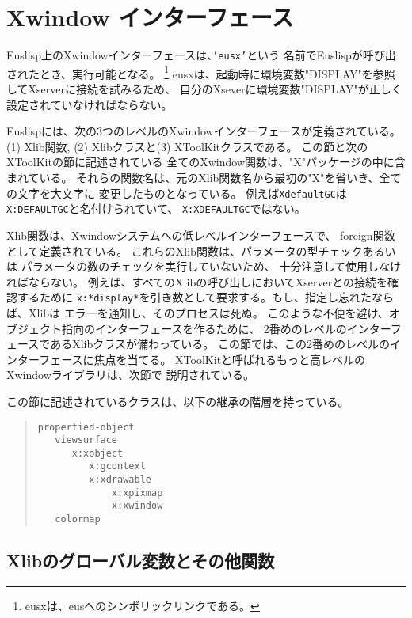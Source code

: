 \section{Xwindow インターフェース}
Euslisp上のXwindowインターフェースは、{\tt 'eusx'}という
名前でEuslispが呼び出されたとき、実行可能となる。
\footnote{eusxは、eusへのシンボリックリンクである。}
eusxは、起動時に環境変数"DISPLAY"を参照してXserverに接続を試みるため、
自分のXseverに環境変数"DISPLAY"が正しく設定されていなければならない。

Euslispには、次の3つのレベルのXwindowインターフェースが定義されている。
(1) Xlib関数, (2) Xlibクラスと(3) XToolKitクラスである。
この節と次のXToolKitの節に記述されている
全てのXwindow関数は、"X"パッケージの中に含まれている。
それらの関数名は、元のXlib関数名から最初の"X"を省いき、全ての文字を大文字に
変更したものとなっている。
例えば{\tt XdefaultGC}は{\tt X:DEFAULTGC}と名付けられていて、
{\tt X:XDEFAULTGC}ではない。

Xlib関数は、Xwindowシステムへの低レベルインターフェースで、
foreign関数として定義されている。
これらのXlib関数は、パラメータの型チェックあるいは
パラメータの数のチェックを実行していないため、
十分注意して使用しなければならない。
例えば、すべてのXlibの呼び出しにおいてXserverとの接続を確認するために
{\tt x:*display*}を引き数として要求する。もし、指定し忘れたならば、Xlibは
エラーを通知し、そのプロセスは死ぬ。
このような不便を避け、オブジェクト指向のインターフェースを作るために、
2番めのレベルのインターフェースであるXlibクラスが備わっている。
この節では、この2番めのレベルのインターフェースに焦点を当てる。
XToolKitと呼ばれるもっと高レベルのXwindowライブラリは、次節で
説明されている。

この節に記述されているクラスは、以下の継承の階層を持っている。

\begin{quote}
\begin{verbatim}
propertied-object
   viewsurface
      x:xobject
         x:gcontext
         x:xdrawable
             x:xpixmap
             x:xwindow
   colormap
\end{verbatim}
\end{quote}

\subsection{\label{xvariables}Xlibのグローバル変数とその他関数}

